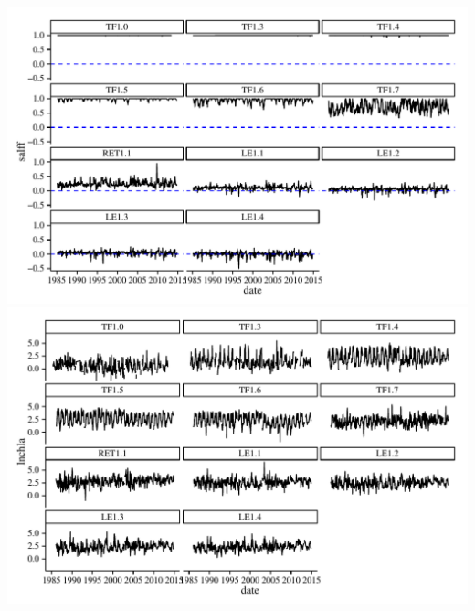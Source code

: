 \documentclass[letterpaper,12pt]{article}\usepackage[]{graphicx}\usepackage[]{color}
\makeatletter
\def\maxwidth{ %
  \ifdim\Gin@nat@width>\linewidth
    \linewidth
  \else
    \Gin@nat@width
  \fi
}
\makeatother
\begin{document}
{\centering \includegraphics[width=\maxwidth]{figs/unnamed-chunk-61} 
\includegraphics[width=\maxwidth]{figs/unnamed-chunk-62} 

}
\end{document}
